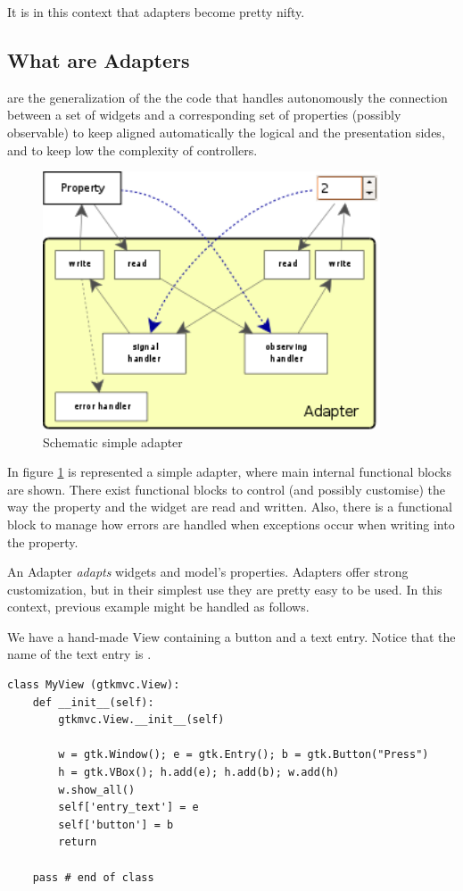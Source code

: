 \smallskip
It is in this context that adapters become pretty nifty. 

\subsection{What are Adapters}

 are the generalization of the the code that handles
autonomously the connection between a set of widgets and a
corresponding set of properties (possibly observable) to keep
aligned automatically the logical and the presentation sides, and to
keep low the complexity of controllers.

\begin{figure}[htbp]
\begin{center}
\includegraphics[width=10cm]{figs/png/adap}
\caption{\label{ADAP_f} Schematic simple adapter}
\end{center}
\end{figure}

In figure \ref{ADAP_f} is represented a simple adapter, where main
internal functional blocks are shown. There exist functional blocks
to control (and possibly customise) the way the property and the
widget are read and written. Also, there is a functional block to
manage how errors are handled when exceptions occur when writing
into the property.

An Adapter \emph{adapts} widgets and model's properties. Adapters
offer strong customization, but in their simplest use they are
pretty easy to be used. In this context, previous example might be
handled as follows.

We have a hand-made View containing a button and a text
entry. Notice that the name of the text entry is
.

{ \codesize
\begin{verbatim}
class MyView (gtkmvc.View):
    def __init__(self):
        gtkmvc.View.__init__(self)

        w = gtk.Window(); e = gtk.Entry(); b = gtk.Button("Press")
        h = gtk.VBox(); h.add(e); h.add(b); w.add(h)
        w.show_all()
        self['entry_text'] = e
        self['button'] = b        
        return

    pass # end of class
\end{verbatim}
}


